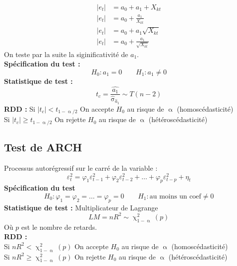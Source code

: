 \documentclass{article}
\begin{document}
\begin{equation*}
		\begin{split}
			|e_t| &= a_0 + a_1 +X_{kt} \\
			|e_t| &= a_0 + \frac{a_1}{X_{kt}} \\
			|e_t| &= a_0 + a_1 \sqrt{X_{kt}} \\
			|e_t| &= a_0 + \frac{a_1}{\sqrt{X_{kt}}}
		\end{split}
\end{equation*}
On teste par la suite la siginificativité de $a_1$.\\
\textbf{Spécification du test :}
\begin{equation*}
		H_0 : a_1 = 0 \qquad H_1 : a_1 \neq 0 
\end{equation*}
\textbf{Statistique de test :}
\begin{equation*}
		t_c = \frac{\hat{a_1}}{\hat{\upsigma}_{\hat{a}_1}} \sim T(n-2)
\end{equation*}
\textbf{RDD : }
Si $|t_c|< t_{1-\upalpha/2}$ On accepte $H_0$ au risque de $\upalpha$ (homoscédasticité)\\
Si $|t_c| \geq t_{1-\upalpha/2}$ On rejette $H_0$ au risque de $\upalpha$ (hétéroscédasticité)\\
\subsection{Test de ARCH}
Processus autorégressif sur le carré de la variable :
\begin{equation*}
		\varepsilon_t^2 = \varphi_1 \varepsilon_{t-1}^2 + \varphi_2 \varepsilon_{t-2}^2 + \ldots + \varphi_p \varepsilon_{t-p}^2 + \eta_t
\end{equation*}
\textbf{Spécification du test}
\begin{equation}
		H_0 : \varphi_1 = \varphi_2 = \ldots = \varphi_p = 0 \qquad H_1 : \text{au moins un coef} \neq 0 
\end{equation}
\textbf{Statistique de test :} Multiplicateur de Lagrange
\begin{equation*}
		LM = n R^2 \sim \upchi^2_{1-\upalpha} (p)
\end{equation*}
Où $p$ est le nombre de retards. \\
\textbf{RDD : } \\
Si $nR^2 < \upchi^2_{1-\upalpha} (p)$ On accepte $H_0$ au risque de $\upalpha$ (homoscédasticité)\\
Si $nR^2 \geq \upchi^2_{1-\upalpha} (p)$ On rejette $H_0$ au risque de $\upalpha$ (hétéroscédasticité)
\end{document}
